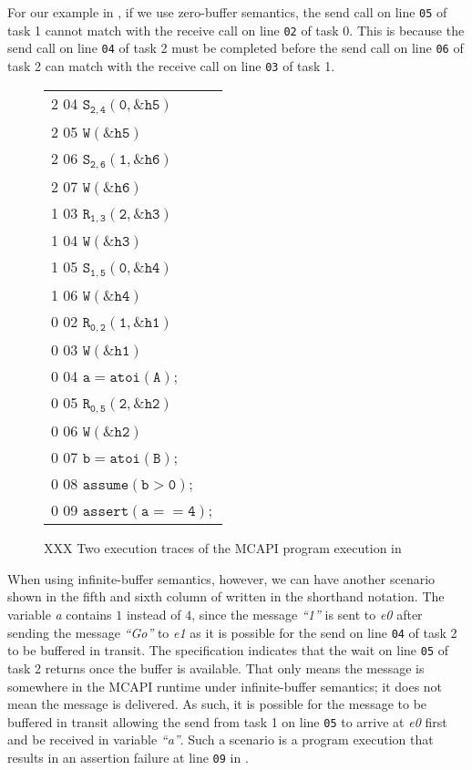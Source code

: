 For our example in , if we use zero-buffer
semantics, the send call on line \texttt{05} of task 1 cannot match
with the receive call on line \texttt{02} of task 0. This is because
the send call on line \texttt{04} of task 2 must be completed before
the send call on line \texttt{06} of task 2 can match with the receive
call on line \texttt{03} of task 1. 

\begin{figure}[h]
\begin{center}
\setlength{\tabcolsep}{2pt}
\scriptsize \begin{tabular}[t]{l}
2 04 $\mathtt{S_{2,4}(0,\&h5)}$ \\
2 05 $\mathtt{W(\&h5)}$ \\
2 06 $\mathtt{S_{2,6}(1,\&h6)}$ \\
2 07 $\mathtt{W(\&h6)}$ \\
\hline
1 03 $\mathtt{R_{1,3}(2,\&h3)}$ \\
1 04 $\mathtt{W(\&h3)}$ \\
1 05 $\mathtt{S_{1,5}(0,\&h4)}$ \\
1 06 $\mathtt{W(\&h4)}$ \\
\hline
0 02 $\mathtt{R_{0,2}(1,\&h1)}$ \\
0 03 $\mathtt{W(\&h1)}$ \\
0 04 $\mathtt{a = atoi(A);}$ \\
0 05 $\mathtt{R_{0,5}(2,\&h2)}$\\
0 06 $\mathtt{W(\&h2)}$ \\
0 07 $\mathtt{b = atoi(B);}$ \\
0 08 $\mathtt{assume (b > 0);}$ \\
0 09 $\mathtt{assert(a == 4);}$ \\
\hline
\end{tabular}
\end{center}
\caption{XXX Two execution traces of the MCAPI program execution in }
\label{fig:trace2}
\end{figure}

When using infinite-buffer semantics, however, we can have another
scenario shown in the fifth and sixth column of 
written in the shorthand notation. The variable \textit{a} contains
$1$ instead of $4$, since the message \textit{``1''} is sent
to \textit{e0} after sending the message \textit{``Go''}
to \textit{e1} as it is possible for the send on line \texttt{04} of
task 2 to be buffered in transit. The specification indicates that the
wait on line \texttt{05} of task 2 returns once the buffer is
available. That only means the message is somewhere in the MCAPI
runtime under infinite-buffer semantics; it does not mean the message
is delivered. As such, it is possible for the message to be buffered
in transit allowing the send from task 1 on line \texttt{05} to arrive
at \textit{e0} first and be received in variable \textit{``a''}. Such
a scenario is a program execution that results in an assertion failure
at line \texttt{09} in .

